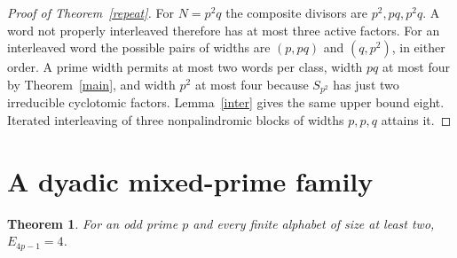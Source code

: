 \documentclass[11pt]{article}
\newtheorem{theorem}{Theorem}
\begin{document}
\begin{proof}[Proof of Theorem~\ref{repeat}]
For \(N=p^2q\) the composite divisors are \(p^2,pq,p^2q\). A word not properly interleaved therefore has at most three active factors. For an interleaved word the possible pairs of widths are \((p,pq)\) and \((q,p^2)\), in either order. A prime width permits at most two words per class, width \(pq\) at most four by Theorem~\ref{main}, and width \(p^2\) at most four because \(S_{p^2}\) has just two irreducible cyclotomic factors. Lemma~\ref{inter} gives the same upper bound eight. Iterated interleaving of three nonpalindromic blocks of widths \(p,p,q\) attains it.
\end{proof}

\section{A dyadic mixed-prime family}
\begin{theorem}\label{fourp}
For an odd prime \(p\) and every finite alphabet of size at least two, \(E_{4p-1}=4\).
\end{theorem}
\end{document}
